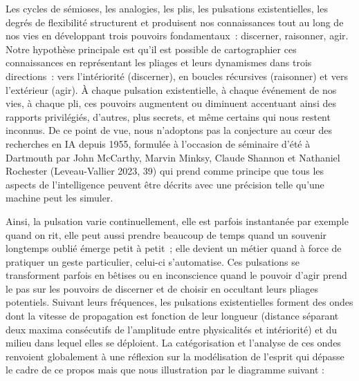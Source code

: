 \documentclass[
  letterpaper,
  DIV=11,
  numbers=noendperiod]{scrreprt}
\begin{document}
Les cycles de sémioses, les analogies, les plis, les pulsations
existentielles, les degrés de flexibilité structurent et produisent nos
connaissances tout au long de nos vies en développant trois pouvoirs
fondamentaux~: discerner, raisonner, agir. Notre hypothèse principale
est qu'il est possible de cartographier ces connaissances en
représentant les pliages et leurs dynamismes dans trois directions~:
vers l'intériorité (discerner), en boucles récursives (raisonner) et
vers l'extérieur (agir). À chaque pulsation existentielle, à chaque
événement de nos vies, à chaque pli, ces pouvoirs augmentent ou
diminuent accentuant ainsi des rapports privilégiés, d'autres, plus
secrets, et même certains qui nous restent inconnus. De ce point de vue,
nous n'adoptons pas la conjecture au cœur des recherches en IA depuis
1955, formulée à l'occasion de séminaire d'été à Dartmouth par John
McCarthy, Marvin Minksy, Claude Shannon et Nathaniel Rochester
(Leveau-Vallier 2023, 39) qui prend comme principe que tous les aspects
de l'intelligence peuvent être décrits avec une précision telle qu'une
machine peut les simuler.

Ainsi, la pulsation varie continuellement, elle est parfois instantanée
par exemple quand on rit, elle peut aussi prendre beaucoup de temps
quand un souvenir longtemps oublié émerge petit à petit~; elle devient
un métier quand à force de pratiquer un geste particulier, celui-ci
s'automatise. Ces pulsations se transforment parfois en bêtises ou en
inconscience quand le pouvoir d'agir prend le pas sur les pouvoirs de
discerner et de choisir en occultant leurs pliages potentiels. Suivant
leurs fréquences, les pulsations existentielles forment des ondes dont
la vitesse de propagation est fonction de leur longueur (distance
séparant deux maxima consécutifs de l'amplitude entre physicalités et
intériorité) et du milieu dans lequel elles se déploient. La
catégorisation et l'analyse de ces ondes renvoient globalement à une
réflexion sur la modélisation de l'esprit qui dépasse le cadre de ce
propos mais que nous illustration par le diagramme suivant :
\end{document}

